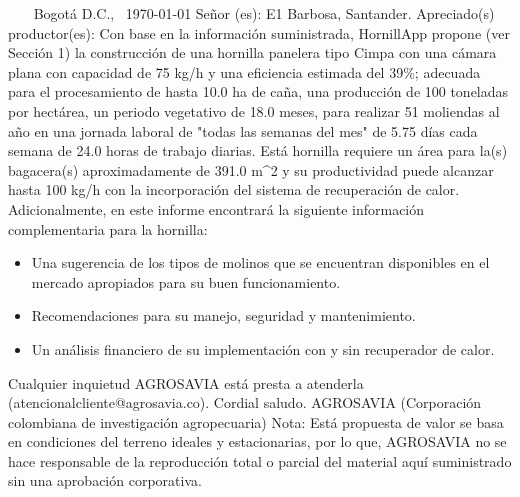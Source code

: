\documentclass{article}%
\begin{document}
\begin{large}%
\textcolor{white}{ 
HH
}%
\linebreak%
Bogotá D.C., %
\ {\today}%
\newline%
 \newline%
%
\linebreak%
\newline%
Señor (es):%
\newline%
E1%
\newline%
 \newline%
 \newline%
Barbosa, Santander.%
\newline%
 \newline%
%
\newline%
Apreciado(s) productor(es):%
\newline%
 \newline%
%
Con base en la información suministrada, HornillApp propone (ver Sección 1) la construcción de una hornilla panelera tipo Cimpa con una cámara plana con capacidad de 75 kg/h y una eficiencia estimada del 39\%; adecuada para el procesamiento de hasta 10.0 ha de caña, una producción de 100 toneladas por hectárea, un periodo vegetativo de 18.0 meses, para realizar 51 moliendas al año en una jornada laboral de "todas las semanas del mes" de 5.75 días cada semana de 24.0 horas de trabajo diarias.\newline%
 Está hornilla requiere un área para la(s) bagacera(s) aproximadamente de 391.0 m\^{}2 y su productividad %
 puede alcanzar hasta 100 kg/h con la incorporación del sistema de recuperación de calor.  Adicionalmente, en este informe encontrará la siguiente información complementaria para la hornilla: %
\begin{itemize}%
\item%
Una sugerencia de los tipos de molinos que se encuentran disponibles en el mercado apropiados para su buen funcionamiento.%
\item%
Recomendaciones para su manejo, seguridad y mantenimiento.%
\item%
Un análisis financiero de su implementación con y sin recuperador de calor.%
\end{itemize}%
Cualquier inquietud AGROSAVIA está presta a atenderla (atencionalcliente@agrosavia.co).\newline%
Cordial saludo.\newline%
\newline%
 \newline%
AGROSAVIA (Corporación colombiana de investigación agropecuaria)%
\newline%
 \newline%
 \newline%
 \newline%
 \newline%
 \newline%
Nota: Está propuesta de valor se basa en condiciones del terreno ideales y estacionarias, por lo que, AGROSAVIA no se hace responsable de la reproducción total o parcial del material aquí suministrado sin una aprobación corporativa.%
\end{large}%
\end{document}
